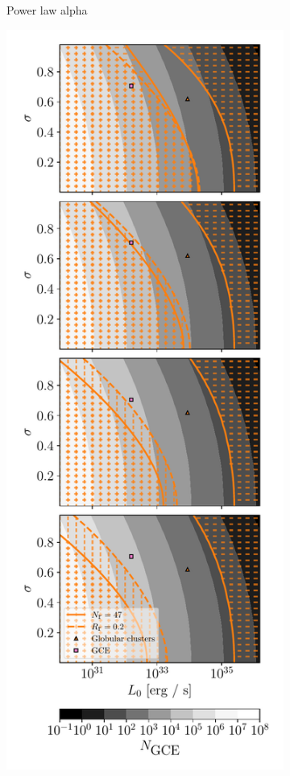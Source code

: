 \documentclass[a4paper,11pt]{article}
\begin{document}
\begin{figure}
\begin{subfigure}[h]{0.32\textwidth}
        \caption{Power law alpha}
        \label{fig:sens-power-law-alpha}
    \end{subfigure}
    \hfill
    \begin{subfigure}[h]{0.32\textwidth}
        \includegraphics[width=\textwidth]{figs/log-normal-sensitivity.pdf}

\end{subfigure}
\end{figure}
\end{document}
